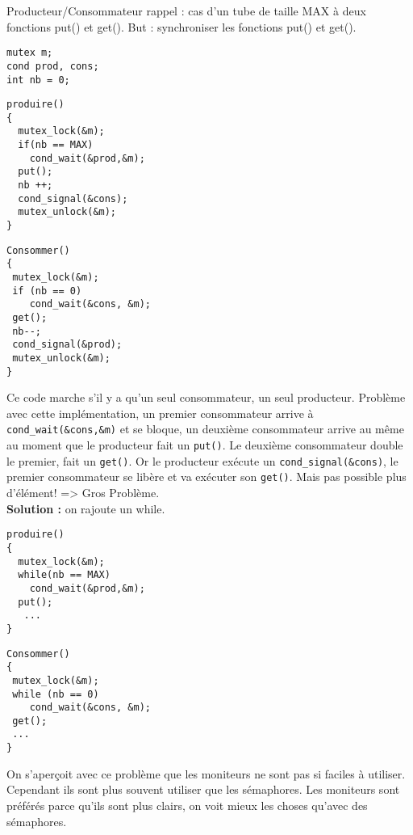 \documentclass[12pt,a4paper]{report}
\begin{document}
Producteur/Consommateur
rappel : cas d'un tube de taille MAX à deux fonctions put() et get(). But : synchroniser les fonctions put() et get().

\verb?mutex m;?\\
\verb?cond prod, cons;?\\
\verb?int nb = 0;?\\
\begin{minipage}{0.5\linewidth}
\begin{verbatim}
produire()
{
  mutex_lock(&m);
  if(nb == MAX)
    cond_wait(&prod,&m);
  put();
  nb ++;
  cond_signal(&cons);
  mutex_unlock(&m);
}
\end{verbatim}
\end{minipage}
\begin{minipage}{0.5\linewidth}
\begin{verbatim}
Consommer()
{
 mutex_lock(&m);
 if (nb == 0)
    cond_wait(&cons, &m);
 get();
 nb--;
 cond_signal(&prod);
 mutex_unlock(&m);
}
\end{verbatim}
\end{minipage}
Ce code marche s'il y a qu'un seul consommateur, un seul producteur.
Problème avec cette implémentation, un premier consommateur arrive à  \verb?cond_wait(&cons,&m)? et se bloque, un deuxième consommateur arrive au même au moment que le producteur fait un \verb?put()?. Le deuxième consommateur double le premier, fait un \verb?get()?. Or le producteur exécute un \verb?cond_signal(&cons)?, le premier consommateur se libère et va exécuter son \verb?get()?. Mais pas possible plus d'élément! => Gros Problème.\\

\textbf{Solution :} on rajoute un while.\\
\begin{minipage}{0.5\linewidth}
\begin{verbatim}
produire()
{
  mutex_lock(&m);
  while(nb == MAX)
    cond_wait(&prod,&m);
  put();
   ...
}
\end{verbatim}
\end{minipage}
\begin{minipage}{0.5\linewidth}
\begin{verbatim}
Consommer()
{
 mutex_lock(&m);
 while (nb == 0)
    cond_wait(&cons, &m);
 get();
 ...
}
\end{verbatim}
\end{minipage}


On s’aperçoit avec ce problème que les moniteurs ne sont pas si faciles à utiliser. Cependant ils sont plus souvent utiliser que les sémaphores. Les moniteurs sont préférés parce qu'ils sont plus clairs, on voit mieux les choses qu'avec des sémaphores.\\
\end{document}
